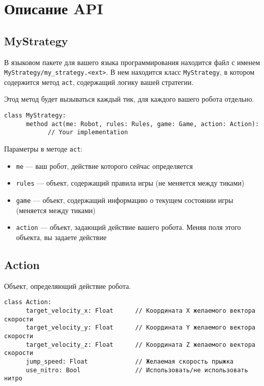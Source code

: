 \chapter{Описание API}\label{api}

\section{MyStrategy}

В языковом пакете для вашего языка программирования находится файл с именем \texttt{MyStrategy/my\_strategy.<ext>}.
В нем находится класс \texttt{MyStrategy}, в котором содержится метод \texttt{act}, содержащий логику вашей стратегии.

Этод метод будет вызываться каждый тик, для каждого вашего робота отдельно.

\begin{verbatim}
class MyStrategy:
      method act(me: Robot, rules: Rules, game: Game, action: Action):
            // Your implementation
\end{verbatim}

Параметры в методе \texttt{act}:
\begin{itemize}
      \item \texttt{me} --- ваш робот, действие которого сейчас определяется
      \item \texttt{rules} --- объект, содержащий правила игры (не меняется между тиками)
      \item \texttt{game} --- объект, содержащий информацию о текущем состоянии игры (меняется между тиками)
      \item \texttt{action} --- объект, задающий действие вашего робота. Меняя поля этого объекта, вы задаете действие
\end{itemize}

\section{Action}

Объект, определяющий действие робота.

\begin{verbatim}
class Action:
      target_velocity_x: Float      // Координата X желаемого вектора скорости
      target_velocity_y: Float      // Координата Y желаемого вектора скорости
      target_velocity_z: Float      // Координата Z желаемого вектора скорости
      jump_speed: Float             // Желаемая скорость прыжка
      use_nitro: Bool               // Использовать/не использовать нитро
\end{verbatim}


